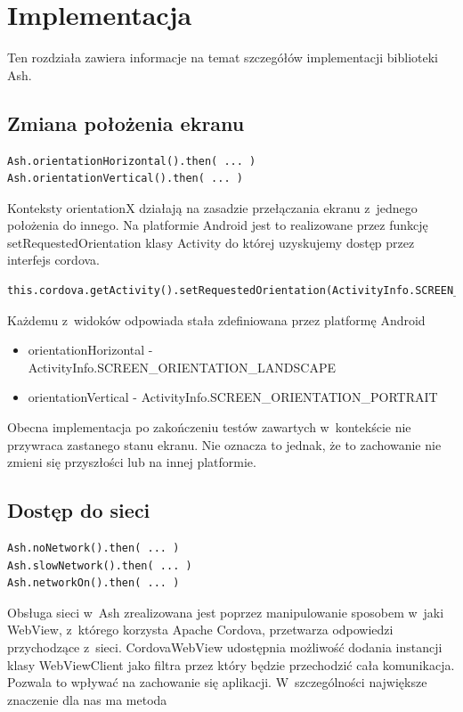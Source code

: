 \documentclass[brudnopis]{xmgr}
\begin{document}
\chapter{Implementacja}

Ten rozdziała zawiera informacje na temat szczegółów implementacji biblioteki Ash.

\section{Zmiana położenia ekranu}

\begin{lstlisting}
Ash.orientationHorizontal().then( ... ) 
Ash.orientationVertical().then( ... ) 
\end{lstlisting}

Konteksty orientationX działają na zasadzie przełączania ekranu z~jednego położenia do innego.  Na platformie Android jest to realizowane przez funkcję setRequestedOrientation klasy Activity do której uzyskujemy dostęp przez interfejs cordova. 

\begin{lstlisting}
this.cordova.getActivity().setRequestedOrientation(ActivityInfo.SCREEN_ORIENTATION_LANDSCAPE);
\end{lstlisting}

Każdemu z~widoków odpowiada stała zdefiniowana przez platformę Android
\begin{itemize}
  \item orientationHorizontal - ActivityInfo.SCREEN\_ORIENTATION\_LANDSCAPE
  \item orientationVertical - ActivityInfo.SCREEN\_ORIENTATION\_PORTRAIT
\end{itemize}

Obecna implementacja po zakończeniu testów zawartych w~kontekście nie przywraca zastanego stanu ekranu. Nie oznacza to jednak, że to zachowanie nie zmieni się przyszłości lub na innej platformie.

\section{Dostęp do sieci}

\begin{lstlisting}
Ash.noNetwork().then( ... ) 
Ash.slowNetwork().then( ... ) 
Ash.networkOn().then( ... ) 
\end{lstlisting}

Obsługa sieci w~Ash zrealizowana jest poprzez manipulowanie sposobem w~jaki WebView, z~którego korzysta Apache Cordova, przetwarza odpowiedzi przychodzące z~sieci. CordovaWebView udostępnia możliwość dodania instancji klasy WebViewClient jako filtra przez który będzie przechodzić cała komunikacja. Pozwala to wpływać na zachowanie się aplikacji. W~szczególności największe znaczenie dla nas ma metoda
\end{document}
